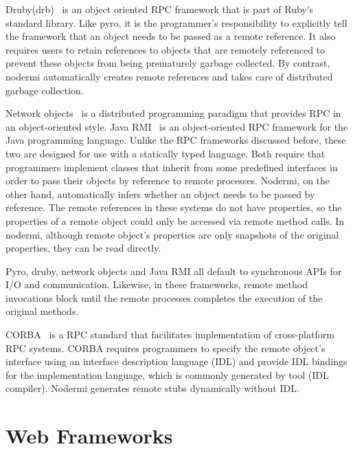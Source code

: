 Druby(drb)~\cite{druby} is an object oriented RPC framework that is part of Ruby's standard
library. Like pyro, it is the programmer's responsibility to explicitly tell
the framework that an object needs to be passed as a remote reference. It also
requires users to retain references to objects that are remotely
referenced  to prevent these objects from being prematurely garbage collected.
By contrast, nodermi automatically creates remote references and
takes care of distributed garbage collection.

Network objects~\cite{birrell1993distributed} is a distributed programming
paradigm that provides RPC in an object-oriented style. Java RMI~\cite{j2eedoc}
is an object-oriented RPC framework for the Java programming language. Unlike the
RPC frameworks discussed before, these two are designed for use with a statically typed language.
Both require that programmers implement classes that inherit from some
predefined interfaces in order to pass their objects by reference to remote processes.
Nodermi, on the other hand, automatically infers whether an object needs to be 
passed by reference.  The remote references in these systems do not
have properties, so the properties of a remote object could only be accessed
via remote method calls. In nodermi, 
although remote object's properties are only snapshots of the original properties, 
they can be read directly.


Pyro, druby, network objects and Java RMI all default to synchronous
APIs for I/O and communication.  Likewise, in these frameworks, remote method invocations 
block until the remote processes completes the execution of the original methods.


CORBA~\cite{vinoski1997corba} is a RPC standard that facilitates implementation
of cross-platform RPC systems. CORBA requires programmers to specify  the
remote object's interface using an interface description language (IDL) and 
provide IDL bindings for the implementation language, which is commonly generated 
by tool (IDL compiler). Nodermi generates remote stubs dynamically without IDL.

\section{Web Frameworks}


